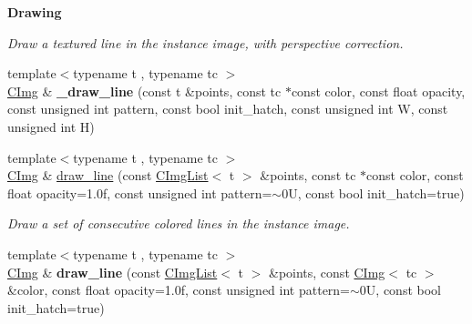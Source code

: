 \begin{Indent}{\bf Drawing}
\begin{DoxyCompactItemize}
\begin{DoxyCompactList}\small\item\em Draw a textured line in the instance image, with perspective correction. \end{DoxyCompactList}\item 
\hypertarget{structcimg__library_1_1_c_img_a58d5ee0985d105ef5bc265d51a28677a}{{\footnotesize template$<$typename t , typename tc $>$ }\\\hyperlink{structcimg__library_1_1_c_img}{C\-Img} \& {\bfseries \-\_\-draw\-\_\-line} (const t \&points, const tc $\ast$const color, const float opacity, const unsigned int pattern, const bool init\-\_\-hatch, const unsigned int W, const unsigned int H)}\label{structcimg__library_1_1_c_img_a58d5ee0985d105ef5bc265d51a28677a}

\item 
{\footnotesize template$<$typename t , typename tc $>$ }\\\hyperlink{structcimg__library_1_1_c_img}{C\-Img} \& \hyperlink{structcimg__library_1_1_c_img_a0b8641a66b4bd165fc5db39274d6f0ea}{draw\-\_\-line} (const \hyperlink{structcimg__library_1_1_c_img_list}{C\-Img\-List}$<$ t $>$ \&points, const tc $\ast$const color, const float opacity=1.\-0f, const unsigned int pattern=$\sim$0\-U, const bool init\-\_\-hatch=true)
\begin{DoxyCompactList}\small\item\em Draw a set of consecutive colored lines in the instance image. \end{DoxyCompactList}\item 
\hypertarget{structcimg__library_1_1_c_img_a427cd113142ffb6eb3d1a658935756e1}{{\footnotesize template$<$typename t , typename tc $>$ }\\\hyperlink{structcimg__library_1_1_c_img}{C\-Img} \& {\bfseries draw\-\_\-line} (const \hyperlink{structcimg__library_1_1_c_img_list}{C\-Img\-List}$<$ t $>$ \&points, const \hyperlink{structcimg__library_1_1_c_img}{C\-Img}$<$ tc $>$ \&color, const float opacity=1.\-0f, const unsigned int pattern=$\sim$0\-U, const bool init\-\_\-hatch=true)}\label{structcimg__library_1_1_c_img_a427cd113142ffb6eb3d1a658935756e1}


\end{DoxyCompactItemize}
\end{Indent}
